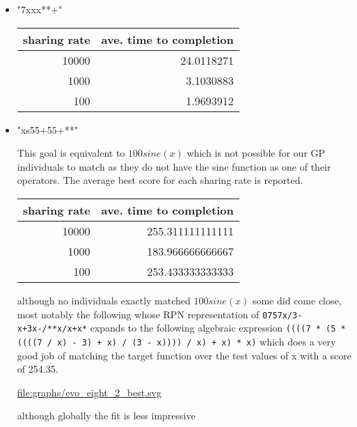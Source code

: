 \documentclass[11pt]{article}
\begin{document}
\begin{itemize}
\begin{itemize}
\item "7xxx**+"\\
\label{sec-1.5.3.2.2}


\begin{center}
\begin{tabular}{rr}
 sharing rate  &  ave. time to completion  \\
\hline
        10000  &               24.0118271  \\
         1000  &                3.1030883  \\
          100  &                1.9693912  \\
\end{tabular}
\end{center}




\item "xs55+55+**"\\
\label{sec-1.5.3.2.3}

This goal is equivalent to $100 sine(x)$ which is not possible for our
GP individuals to match as they do not have the sine function as one
of their operators.  The average best score for each sharing rate is
reported.

\begin{center}
\begin{tabular}{rr}
 sharing rate  &  ave. time to completion  \\
\hline
        10000  &         255.311111111111  \\
         1000  &         183.966666666667  \\
          100  &         253.433333333333  \\
\end{tabular}
\end{center}



although no individuals exactly matched $100 sine(x)$ some did come
close, most notably the following whose RPN representation of
\texttt{0757x/3-x+3x-/**x/x+x*} expands to the following algebraic expression
\texttt{((((7 * (5 * ((((7 / x) - 3) + x) / (3 - x)))) / x) + x) * x)} which
does a very good job of matching the target function over the test
values of x with a score of 254.35.



\href{file:///nfs/adaptive/eschulte/src/gp4ixm-report/graphs/evo_eight_2_best.svg}{file:graphs/evo\_eight\_2\_best.svg}

although globally the fit is less impressive




\end{itemize}
\end{itemize}
\end{document}
